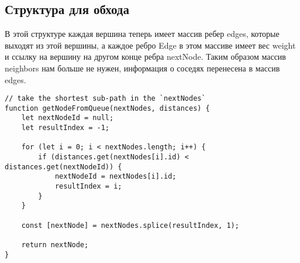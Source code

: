 \documentclass[../../article.tex]{subfiles}
\begin{document}
\subsection{Структура для обхода}

В этой структуре каждая вершина теперь имеет массив ребер {\firacodebold edges}, которые выходят из этой вершины, а каждое ребро {\firacodebold Edge} в этом массиве имеет вес {\firacodebold weight} и ссылку на вершину на другом конце ребра {\firacodebold nextNode}. Таким образом массив {\firacodebold neighbors} нам больше не нужен, информация о соседях перенесена в массив {\firacodebold edges}.

\begin{figure*}
    \begin{ruledelement}
        \begin{lstlisting}[caption={Отличие алгоритма дейкстры}, label={lst:dijkstraDiffBfs}]
// take the shortest sub-path in the `nextNodes`
function getNodeFromQueue(nextNodes, distances) {
    let nextNodeId = null;
    let resultIndex = -1;

    for (let i = 0; i < nextNodes.length; i++) {
        if (distances.get(nextNodes[i].id) < distances.get(nextNodeId)) {
            nextNodeId = nextNodes[i].id;
            resultIndex = i;
        }
    }

    const [nextNode] = nextNodes.splice(resultIndex, 1);

    return nextNode;
}
        \end{lstlisting}
    \end{ruledelement}
\end{figure*}
\end{document}
